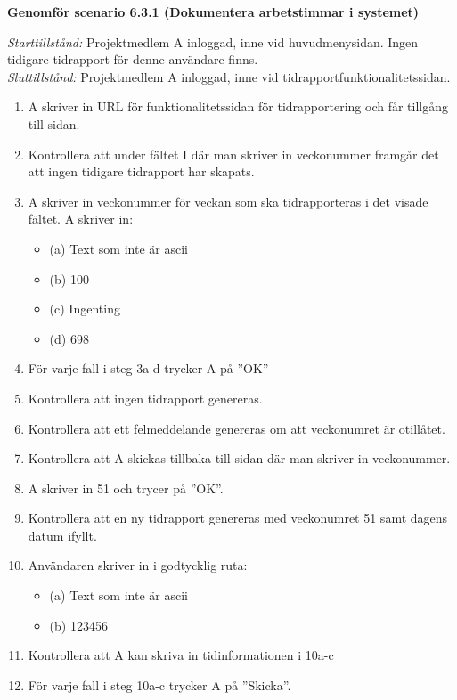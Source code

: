 \documentclass[a4paper]{article}
\begin{document}
\begin{ST}




\item
\textbf{Genomför scenario 6.3.1 (Dokumentera arbetstimmar i systemet)}

\emph{Starttillstånd:} Projektmedlem A inloggad, inne vid huvudmenysidan. Ingen tidigare tidrapport för denne användare finns.\\
\emph{Sluttillstånd:} Projektmedlem A inloggad, inne vid tidrapportfunktionalitetssidan.\\

\begin{enumerate}
\item A skriver in URL för funktionalitetssidan för tidrapportering och får tillgång till sidan.
\item Kontrollera att under fältet I där man skriver in veckonummer framgår det att ingen tidigare tidrapport har skapats.
\item A skriver in veckonummer för veckan som ska tidrapporteras i det visade fältet. A skriver in:
\begin{itemize}
\item[] (a) Text som inte är ascii
\item[] (b) 100
\item[] (c) Ingenting
\item[] (d) 698
\end{itemize}
\item För varje fall i steg 3a-d trycker A på ''OK''
\item Kontrollera att ingen tidrapport genereras.
\item Kontrollera att ett felmeddelande genereras om att veckonumret är otillåtet.
\item Kontrollera att A skickas tillbaka till sidan där man skriver in veckonummer.
\item A skriver in 51 och trycer på ''OK''.
\item Kontrollera att en ny tidrapport genereras med veckonumret 51 samt dagens datum ifyllt.
\item Användaren skriver in i godtycklig ruta:
\begin{itemize}
\item[] (a) Text som inte är ascii
\item[] (b) 123456
\end{itemize}
\item Kontrollera att A kan skriva in tidinformationen i 10a-c
\item För varje fall i steg 10a-c trycker A på ''Skicka''. 

\end{enumerate}
\end{ST}
\end{document}
